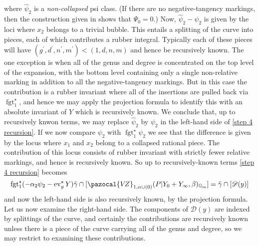 \documentclass[11pt]{amsart}
\newcommand{\VZ}{\pazocal{V\!Z}}
\newcommand{\st}{\star}
\newcommand{\Gm}{\mathbb{G}_{\text{m}}}
\newcommand{\ev}{\operatorname{ev}}
\newcommand{\fgt}{\operatorname{fgt}}
\newcommand{\Dcal}{\mathcal{D}}
\theoremstyle{definition}
\theoremstyle{definition}
\begin{document}
where $\hat\psi_2$ is a \emph{non-collapsed} psi class. (If there are no negative-tangency markings, then the construction given in \cite[\S 1.5.2]{MaulikPandharipande} shows that $\Psi_0=0$.) Now, $\hat\psi_2 - \psi_2$ is given by the loci where $x_2$ belongs to a trivial bubble. This entails a splitting of the curve into pieces, each of which contributes a rubber integral. Typically each of these pieces will have $(g^\prime,d^\prime,n^\prime,m^\prime) < (1,d,n,m)$ and hence be recursively known. The one exception is when all of the genus and degree is concentrated on the top level of the expansion, with the bottom level containing only a single non-relative marking in addition to all the negative-tangency markings. But in this case the contribution is a rubber invariant where all of the insertions are pulled back via $\fgt_1^\st$, and hence we may apply the projection formula to identify this with an absolute invariant of $Y$ which is recursively known. We conclude that, up to recursively knwon terms, we may replace $\hat\psi_2$ by $\psi_2$ in the left-hand side of \eqref{step 4 recursion}. If we now compare $\psi_2$ with $\fgt_1^\st \psi_2$ we see that the difference is given by the locus where $x_1$ and $x_2$ belong to a collapsed rational piece. The contribution of this locus consists of rubber invariant with strictly fewer relative markings, and hence is recursively known. So up to recursively-known terms \eqref{step 4 recursion} becomes
\begin{equation*} \fgt_1^\st (-\alpha_2\psi_2 - \ev_y^\st Y)\tilde\gamma \cap [\VZ_{1,\alpha\cup(0)}(P|Y_0+Y_\infty,\beta)_{\Gm}] = \tilde\gamma\cap[\Dcal(y)]\end{equation*}
and now the left-hand side is also recursively known, by the projection formula. Let us now examine the right-hand side. The components of $\Dcal(y)$ are indexed by splittings of the curve, and certainly the contributions are recursively known unless there is a piece of the curve carrying all of the genus and degree, so we may restrict to examining these contributions.
\end{document}
